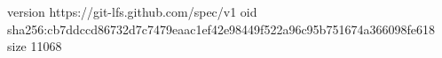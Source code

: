 version https://git-lfs.github.com/spec/v1
oid sha256:cb7ddccd86732d7c7479eaac1ef42e98449f522a96c95b751674a366098fe618
size 11068
